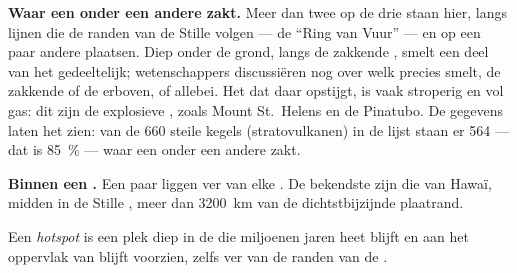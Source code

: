 \textbf{Waar een  onder een andere zakt.} Meer dan twee op de drie
 staan hier, langs lijnen die de randen van de Stille  volgen
--- de ``Ring van Vuur'' --- en op een paar andere plaatsen. Diep onder de
grond, langs de zakkende , smelt een deel van het 
gedeeltelijk; wetenschappers discussiëren nog over welk  precies
smelt, de zakkende  of de  erboven, of allebei. Het  dat
daar opstijgt, is vaak stroperig en vol gas: dit zijn de explosieve
, zoals Mount St.~Helens en de Pinatubo. De gegevens laten het
zien: van de 660 steile kegels (stratovulkanen) in de lijst staan er 564
--- dat is 85~\% --- waar een  onder een andere zakt.

\textbf{Binnen een .} Een paar  liggen ver van elke
. De bekendste zijn die van Hawaï, midden in de Stille ,
meer dan \qty{3200}{km} van de dichtstbijzijnde plaatrand.

\begin{definition}[Hotspot]\label{def:g7:volcanoes:hotspot}
Een \emph{hotspot} is een plek diep in de  die
miljoenen jaren heet blijft en  aan het oppervlak van  blijft
voorzien, zelfs ver van de randen van de .
\end{definition}

